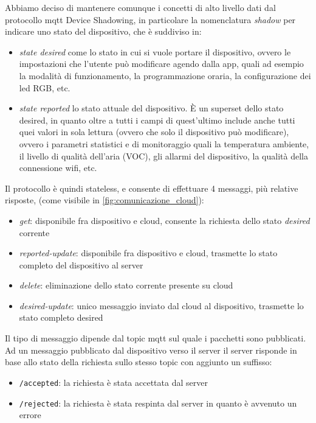 \documentclass[12pt,a4paper,twoside,titlepage]{book}
\begin{document}
Abbiamo deciso di mantenere comunque i concetti di alto livello dati dal protocollo \Gls{mqtt}
Device Shadowing, in particolare la nomenclatura \textit{shadow} per indicare uno stato del
dispositivo, che è suddiviso in:
\begin{itemize}
    \item \textit{state desired} come lo stato in cui si vuole portare il dispositivo, ovvero le
        impostazioni che l'utente può modificare agendo dalla app, quali ad esempio la modalità di funzionamento,
        la programmazione oraria, la configurazione dei \acrshort{led} RGB, etc.
    \item \textit{state reported} lo stato attuale del dispositivo. È un superset dello stato
        desired, in quanto oltre a tutti i campi di quest'ultimo include anche tutti quei valori
        in sola lettura (ovvero che solo il dispositivo può modificare), ovvero i parametri
        statistici e di monitoraggio quali la temperatura ambiente, il livello di qualità dell'aria (VOC),
        gli allarmi del dispositivo, la qualità della connessione \Gls{wifi}, etc.
\end{itemize}

Il protocollo è quindi stateless, e consente di effettuare 4 messaggi, più relative risposte,
(come visibile in \autoref{fig:comunicazione_cloud}):

\begin{itemize}
    \item \textit{get}: disponibile fra dispositivo e cloud, consente la richiesta dello stato \textit{desired} corrente
    \item \textit{reported-update}: disponibile fra dispositivo e cloud, trasmette lo stato
        completo del dispositivo al server
    \item \textit{delete}: eliminazione dello stato corrente presente su cloud
    \item \textit{desired-update}: unico messaggio inviato dal cloud al dispositivo,
        trasmette lo stato completo desired
\end{itemize}

Il tipo di messaggio dipende dal \gls{topic} \Gls{mqtt} sul quale i pacchetti sono pubblicati. Ad
un messaggio pubblicato dal dispositivo verso il server il server risponde in base allo
stato della richiesta sullo stesso \gls{topic} con aggiunto un suffisso:
\begin{itemize}
    \item \texttt{/accepted}: la richiesta è stata accettata dal server
    \item \texttt{/rejected}: la richiesta è stata respinta dal server in quanto è
        avvenuto un errore
\end{itemize}
\end{document}

